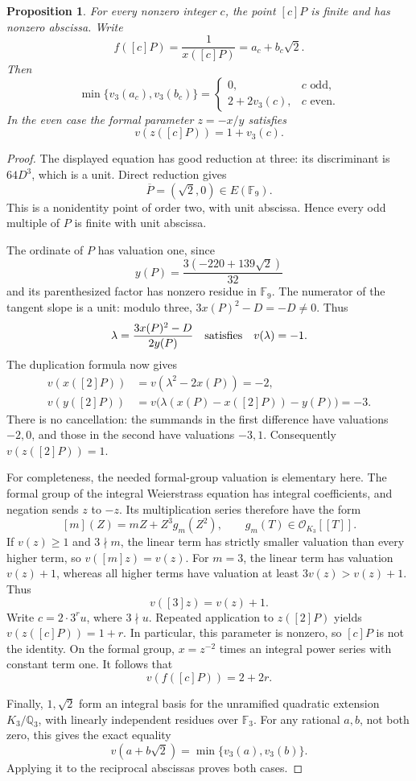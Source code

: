 \documentclass[11pt,a4paper]{article}
\newtheorem{proposition}[theorem]{Proposition}
\theoremstyle{definition}
\theoremstyle{remark}
\begin{document}
\begin{proposition}\label{anchor3:exact-depth}
For every nonzero integer $c$, the point $[c]P$ is finite and has
nonzero abscissa.  Write
\[
             f([c]P)=\frac1{x([c]P)}=a_c+b_c\sqrt2.
\]
Then
\[
 \min\{v_3(a_c),v_3(b_c)\}=
 \begin{cases}
 0,&c\text{ odd},\\
 2+2v_3(c),&c\text{ even}.
 \end{cases}
\]
In the even case the formal parameter $z=-x/y$ satisfies
\[
                  v(z([c]P))=1+v_3(c).
\]
\end{proposition}
\begin{proof}
The displayed equation has good reduction at three: its discriminant is
$64D^3$, which is a unit.  Direct reduction gives
\[
             \overline P=(\sqrt2,0)\in E(\mathbb F_9).
\]
This is a nonidentity point of order two, with unit abscissa.  Hence
every odd multiple of $P$ is finite with unit abscissa.

The ordinate of $P$ has valuation one, since
\[
 y(P)=\frac{3(-220+139\sqrt2)}{32}
\]
and its parenthesized factor has nonzero residue in $\mathbb F_9$.
The numerator of the tangent slope is a unit: modulo three,
$3x(P)^2-D=-D\ne0$.  Thus
\[
 \lambda=\frac{3x(P)^2-D}{2y(P)}
 \quad\hbox{satisfies}\quad v(\lambda)=-1.
\]
The duplication formula now gives
\[
 \begin{split}
 v(x([2]P))&=v(\lambda^2-2x(P))=-2,\\
 v(y([2]P))&=v\bigl(\lambda(x(P)-x([2]P))-y(P)\bigr)=-3.
 \end{split}
\]
There is no cancellation: the summands in the first difference have
valuations $-2,0$, and those in the second have valuations $-3,1$.
Consequently $v(z([2]P))=1$.

For completeness, the needed formal-group valuation is elementary here.
The formal group of the integral Weierstrass equation has integral
coefficients, and negation sends $z$ to $-z$.  Its multiplication series
therefore have the form
\[
                  [m](Z)=mZ+Z^3g_m(Z^2),
                  \qquad g_m(T)\in\mathcal O_{K_3}[[T]].
\]
If $v(z)\ge1$ and $3\nmid m$, the linear term has strictly smaller
valuation than every higher term, so $v([m]z)=v(z)$.
For $m=3$, the linear term has valuation $v(z)+1$, whereas all higher
terms have valuation at least $3v(z)>v(z)+1$.  Thus
\[
                    v([3]z)=v(z)+1.
\]
Write $c=2\cdot3^ru$, where $3\nmid u$.  Repeated application to
$z([2]P)$ yields $v(z([c]P))=1+r$.  In particular, this parameter
is nonzero, so $[c]P$ is not the identity.  On the formal group,
$x=z^{-2}$ times an integral power series with constant term one.
It follows that
\[
                    v(f([c]P))=2+2r.
\]

Finally, $1,\sqrt2$ form an integral basis for the unramified quadratic
extension $K_3/\mathbb Q_3$, with linearly independent residues over
$\mathbb F_3$.  For any rational $a,b$, not both zero, this gives the
exact equality
\[
                  v(a+b\sqrt2)=\min\{v_3(a),v_3(b)\}.
\]
Applying it to the reciprocal abscissas proves both cases.
\end{proof}
\end{document}
